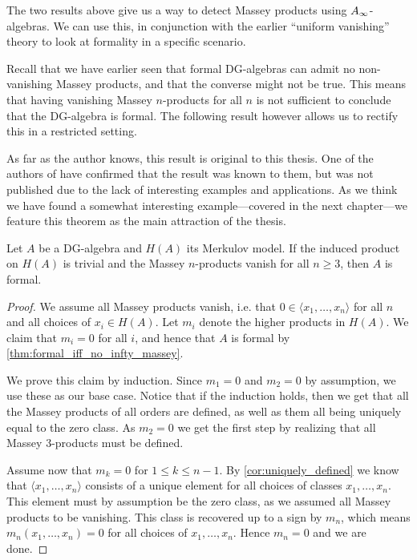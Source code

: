 The two results above give us a way to detect Massey products using $A_{\infty}$-algebras. We can use this, in conjunction with the earlier ``uniform vanishing'' theory to look at formality in a specific scenario. 

Recall that we have earlier seen that formal DG-algebras can admit no non-vanishing Massey products, and that the converse might not be true. This means that having vanishing Massey $n$-products for all $n$ is not sufficient to conclude that the DG-algebra is formal. The following result however allows us to rectify this in a restricted setting. 

As far as the author knows, this result is original to this thesis. One of the authors of \cite{detection} have confirmed that the result was known to them, but was not published due to the lack of interesting examples and applications. As we think we have found a somewhat interesting example---covered in the next chapter---we feature this theorem as the main attraction of the thesis. 

\begin{theorem}
\label{thm:cuptrivial_no_massey_then_formal}
Let $A$ be a DG-algebra and $H(A)$ its Merkulov model. If the induced product on $H(A)$ is trivial and the Massey $n$-products vanish for all $n\geq 3$, then $A$ is formal. 
\end{theorem}
\begin{proof}
We assume all Massey products vanish, i.e. that $0\in \langle x_1, \ldots, x_n\rangle $ for all $n$ and all choices of $x_i\in H(A)$. Let $m_i$ denote the higher products in $H(A)$. We claim that $m_i = 0$ for all $i$, and hence that $A$ is formal by \cref{thm:formal_iff_no_infty_massey}. 

We prove this claim by induction. Since $m_1 = 0$ and $m_2 = 0$ by assumption, we use these as our base case. Notice that if the induction holds, then we get that all the Massey products of all orders are defined, as well as them all being uniquely equal to the zero class. As $m_2=0$ we get the first step by realizing that all Massey 3-products must be defined. 

Assume now that $m_k = 0$ for $1\leq k\leq n-1$. By \cref{cor:uniquely_defined} we know that $\langle x_1, \ldots, x_n \rangle$ consists of a unique element for all choices of classes $x_1, \ldots, x_n$. This element must by assumption be the zero class, as we assumed all Massey products to be vanishing. This class is recovered up to a sign by $m_n$, which means $m_n(x_1,\ldots, x_n)=0$ for all choices of $x_1, \ldots, x_n$. Hence $m_n=0$ and we are done. 
\end{proof}

